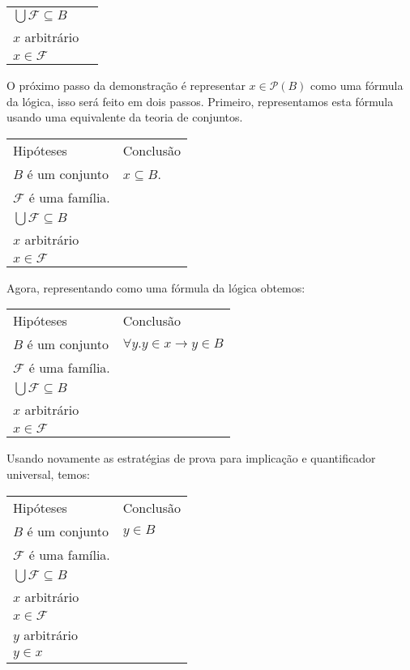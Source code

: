 \begin{Example}
\begin{flushleft}
\begin{tabular}{ll}
$\bigcup \mathcal{F} \subseteq B$ & \\
$x$ arbitrário & \\
$x\in\mathcal{F}$ & \\
\end{tabular}
\end{flushleft}
O próximo passo da demonstração é representar $x\in\mathcal{P}(B)$
como uma fórmula da lógica, isso será feito em dois passos. Primeiro,
representamos esta fórmula usando uma equivalente da teoria de
conjuntos.
\begin{flushleft}
\begin{tabular}{ll}
Hipóteses & Conclusão \\
$B$ é um conjunto & $ x\subseteq B$. \\
$\mathcal{F}$ é uma família. & \\
$\bigcup \mathcal{F} \subseteq B$ & \\
$x$ arbitrário & \\
$x\in\mathcal{F}$ & \\
\end{tabular}
\end{flushleft}
Agora, representando como uma fórmula da lógica obtemos:
\begin{flushleft}
\begin{tabular}{ll}
Hipóteses & Conclusão \\
$B$ é um conjunto & $ \forall y. y\in x \to y \in B$ \\
$\mathcal{F}$ é uma família. & \\
$\bigcup \mathcal{F} \subseteq B$ & \\
$x$ arbitrário & \\
$x\in\mathcal{F}$ & \\
\end{tabular}
\end{flushleft}
Usando novamente as estratégias de prova para implicação e
quantificador universal, temos:
\begin{flushleft}
\begin{tabular}{ll}
Hipóteses & Conclusão \\
$B$ é um conjunto & $ y \in B$ \\
$\mathcal{F}$ é uma família. & \\
$\bigcup \mathcal{F} \subseteq B$ & \\
$x$ arbitrário & \\
$x\in\mathcal{F}$ & \\
$y$ arbitrário & \\
$y\in x$ & \\

\end{tabular}
\end{flushleft}
\end{Example}

